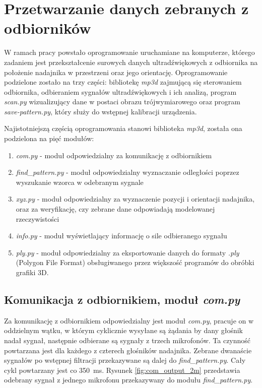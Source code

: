 \chapter{Przetwarzanie danych zebranych z odbiorników}

W ramach pracy powstało oprogramowanie uruchamiane na komputerze, którego zadaniem jest
przekształcenie surowych danych ultradźwiękowych 
z odbiornika na położenie nadajnika w przestrzeni oraz jego orientację.
Oprogramowanie podzielone zostało na trzy części: bibliotekę \textit{mp3d} zajmującą się
sterowaniem odbiornika, odbieraniem sygnałów ultradźwiękowych i ich analizą, program \textit{scan.py}
wizualizujący dane w postaci obrazu trójwymiarowego oraz program \textit{save-pattern.py},
który służy do wstępnej kalibracji urządzenia.


Najistotniejszą częścią oprogramowania stanowi biblioteka \textit{mp3d}, została ona podzielona na pięć modułów:
\begin{enumerate}
 \item \textit{com.py} - moduł odpowiedzialny za komunikację z odbiornikiem
 \item \textit{find\_pattern.py} - moduł odpowiedzialny wyznaczanie odległości poprzez wyszukanie wzorca w odebranym sygnale
 \item \textit{xyz.py} - moduł odpowiedzialny za wyznaczenie pozycji i orientacji nadajnika, oraz za 
 weryfikację, czy zebrane dane odpowiadają modelowanej rzeczywistości
 \item \textit{info.py} - moduł wyświetlający informację o sile odbieranego sygnału
 \item \textit{ply.py} - moduł odpowiedzialny za eksportowanie danych do formaty \textit{.ply} 
    (Polygon File Format) obsługiwanego przez większość programów do obróbki grafiki 3D.
\end{enumerate}


\section{Komunikacja z odbiornikiem, moduł \textit{com.py}}

Za komunikację z odbiornikiem odpowiedzialny jest moduł \textit{com.py},
pracuje on w oddzielnym wątku, w którym cyklicznie wysyłane są żądania by dany głośnik nadał sygnał,
następnie odbierane są sygnały z trzech mikrofonów.
Ta czynność powtarzana jest dla każdego z czterech głośników nadajnika.
Zebrane dwanaście sygnałów po wstępnej filtracji przekazywane są dalej do \textit{find\_pattern.py}. Cały cykl powtarzany jest
co \SI{350}{ms}. Rysunek \ref{fig:com_output_2m} przedstawia odebrany sygnał z jednego mikrofonu przekazywany do modułu \textit{find\_pattern.py}.


